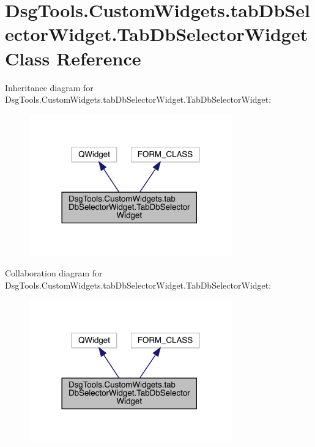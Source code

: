 \hypertarget{class_dsg_tools_1_1_custom_widgets_1_1tab_db_selector_widget_1_1_tab_db_selector_widget}{}\section{Dsg\+Tools.\+Custom\+Widgets.\+tab\+Db\+Selector\+Widget.\+Tab\+Db\+Selector\+Widget Class Reference}
\label{class_dsg_tools_1_1_custom_widgets_1_1tab_db_selector_widget_1_1_tab_db_selector_widget}


Inheritance diagram for Dsg\+Tools.\+Custom\+Widgets.\+tab\+Db\+Selector\+Widget.\+Tab\+Db\+Selector\+Widget\+:
\nopagebreak
\begin{figure}[H]
\begin{center}
\leavevmode
\includegraphics[width=248pt]{class_dsg_tools_1_1_custom_widgets_1_1tab_db_selector_widget_1_1_tab_db_selector_widget__inherit__graph}
\end{center}
\end{figure}


Collaboration diagram for Dsg\+Tools.\+Custom\+Widgets.\+tab\+Db\+Selector\+Widget.\+Tab\+Db\+Selector\+Widget\+:
\nopagebreak
\begin{figure}[H]
\begin{center}
\leavevmode
\includegraphics[width=248pt]{class_dsg_tools_1_1_custom_widgets_1_1tab_db_selector_widget_1_1_tab_db_selector_widget__coll__graph}
\end{center}
\end{figure}
